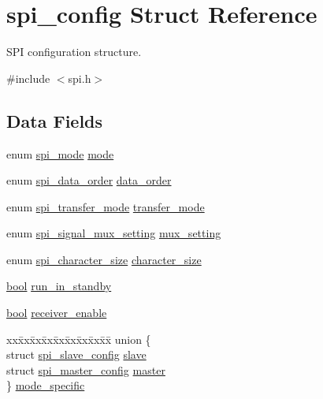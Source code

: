 \hypertarget{structspi__config}{}\section{spi\+\_\+config Struct Reference}
\label{structspi__config}


S\+PI configuration structure.  




{\ttfamily \#include $<$spi.\+h$>$}

\subsection*{Data Fields}
\begin{DoxyCompactItemize}
\item 
enum \mbox{\hyperlink{group__asfdoc__sam0__sercom__spi__group_ga78c1313670220bedfecdb138d4c27903}{spi\+\_\+mode}} \mbox{\hyperlink{structspi__config_aa56044693231ac71d809d1c28e94800a}{mode}}
\item 
enum \mbox{\hyperlink{group__asfdoc__sam0__sercom__spi__group_gabaa69dbc0601cb5b1e2681400598a4b2}{spi\+\_\+data\+\_\+order}} \mbox{\hyperlink{structspi__config_acf9451596e18d899f5c9f5ac019e234f}{data\+\_\+order}}
\item 
enum \mbox{\hyperlink{group__asfdoc__sam0__sercom__spi__group_ga9c30fdfffba6be76b4044ccb17b218e5}{spi\+\_\+transfer\+\_\+mode}} \mbox{\hyperlink{structspi__config_aa6612419a505f9a340d1bdda22274adc}{transfer\+\_\+mode}}
\item 
enum \mbox{\hyperlink{group__asfdoc__sam0__sercom__spi__group_ga420e19efe4a923eb9ab6dc619a23c370}{spi\+\_\+signal\+\_\+mux\+\_\+setting}} \mbox{\hyperlink{structspi__config_a973f48b0b9271ae4ce74235c108a5d69}{mux\+\_\+setting}}
\item 
enum \mbox{\hyperlink{group__asfdoc__sam0__sercom__spi__group_ga79e8becd0bcea19b99e7eb7fe8a9d6b7}{spi\+\_\+character\+\_\+size}} \mbox{\hyperlink{structspi__config_a7ca9bf5df3e678e26819ff8444041797}{character\+\_\+size}}
\item 
\mbox{\hyperlink{group__group__sam0__utils_ga97a80ca1602ebf2303258971a2c938e2}{bool}} \mbox{\hyperlink{structspi__config_a514964d5c2a8da4dd96bac82a53477f2}{run\+\_\+in\+\_\+standby}}
\item 
\mbox{\hyperlink{group__group__sam0__utils_ga97a80ca1602ebf2303258971a2c938e2}{bool}} \mbox{\hyperlink{structspi__config_aeb0ee3a89acb7a67727a62a68adf0120}{receiver\+\_\+enable}}
\item 
\begin{tabbing}
xx\=xx\=xx\=xx\=xx\=xx\=xx\=xx\=xx\=\kill
union \{\\
\>struct \mbox{\hyperlink{structspi__slave__config}{spi\_slave\_config}} \mbox{\hyperlink{structspi__config_a64443d2e45f9103b7ab0166ab7e44a41}{slave}}\\
\>struct \mbox{\hyperlink{structspi__master__config}{spi\_master\_config}} \mbox{\hyperlink{structspi__config_a03ce4a83f9312e08f9ec6bff0dfdbf28}{master}}\\
\} \mbox{\hyperlink{structspi__config_a0f7ed07442eb6f29d7188434c1c5e177}{mode\_specific}}\\


\end{tabbing}
\end{DoxyCompactItemize}
